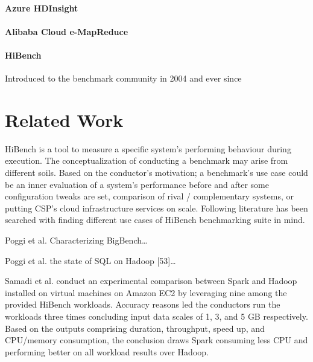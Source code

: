 \documentclass[review]{elsarticle}
\begin{document}
\paragraph{Azure HDInsight \cite{noauthor_azure_nodate}}

\paragraph{Alibaba Cloud e-MapReduce \cite{noauthor_e-mapreduce_nodate}}

\paragraph{HiBench \cite{noauthor_intel-bigdatahibench_2021}} Introduced to the benchmark community in 2004 and ever since




\section{Related Work}
HiBench is a tool to measure a specific system’s performing behaviour during execution. The conceptualization of conducting a benchmark may arise from different soils. Based on the conductor’s motivation; a benchmark’s use case could be an inner evaluation of a system’s performance before and after some configuration tweaks are set, comparison of rival / complementary systems, or putting CSP’s cloud infrastructure services on scale. Following literature has been searched with finding different use cases of HiBench benchmarking suite in mind. 

Poggi et al. \cite{poggi_characterizing_2018} Characterizing BigBench…

Poggi et al. \cite{poggi_state_2016} the state of SQL on Hadoop [53]…

Samadi et al. \cite{samadi_performance_2018} conduct an experimental comparison between Spark and Hadoop installed on virtual machines on Amazon EC2 by leveraging nine among the provided HiBench workloads. Accuracy reasons led the conductors run the workloads three times concluding input data scales of 1, 3, and 5 GB respectively. Based on the outputs comprising duration, throughput, speed up, and CPU/memory consumption, the conclusion draws Spark consuming less CPU and performing better on all workload results over Hadoop. 
\end{document}
